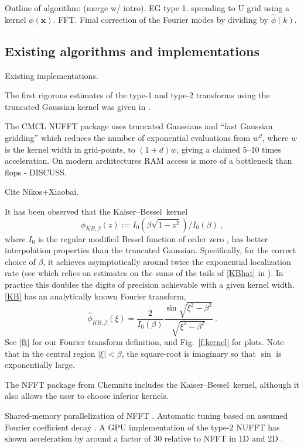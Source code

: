 \documentclass[10pt]{article}
\newcommand{\be}{\begin{equation}}
\newcommand{\ee}{\end{equation}}
\newcommand{\mbf}[1]{{\mathbf #1}}
\newcommand{\xx}{\mbf{x}}
\newcommand{\KB}{Kaiser--Bessel}
\newcommand{\freq}{\beta}          %
\begin{document}
Outline of algorithm: (merge w/ intro).
EG type 1.
spreading to U grid using a kernel $\phi(\xx)$.
FFT.
Final correction of the Fourier modes by dividing by
$\hat\phi(k)$.

\subsection{Existing algorithms and implementations}


Existing implementations.

The first rigorous estimates of the type-1 and type-2 transforms
using the truncated Gaussian kernel was given in \cite{dutt}.

The CMCL NUFFT package \cite{cmcl} uses truncated Gaussians
and ``fast Gaussian gridding'' \cite[Sec.~3]{nufft}
which reduces the number of exponential evaluations
from $w^d$, where $w$ is the kernel width in grid-points,
to $(1+d)w$, giving a claimed 5--10 times acceleration.
On modern architectures RAM access is more of a bottleneck than
flops - DISCUSS.

Cite Nikos+Xiaobai.

It has been observed that the \KB\ kernel
\be
\phi_{KB,\freq}(z) := I_0(\freq\sqrt{1-z^2}) / I_0(\freq)
~,
\label{KB}
\ee
where $I_0$ is the regular modified Bessel function of order zero
\cite[(10.25.2)]{DLMF}, has better interpolation
properties than the truncated Gaussian.
Specifically, for the correct choice of $\freq$, it achieves
asymptotically around twice the exponential localization rate
(see \cite[p.19, (C.1) vs (C.4)]{nfft} which relies on
estimates on the sums of the tails of \eqref{KBhat}
in \cite{fourmontthesis,fourmont,pottshabil}).
In practice this doubles the digits of precision achievable with
a given kernel width.
\eqref{KB} has an analytically known Fourier transform,
\be
\hat\phi_{KB,\freq}(\xi) = \frac{2}{I_0(\freq)}
\frac{\sin \sqrt{\xi^2-\freq^2}}{\sqrt{\xi^2-\freq^2}}
~.
\label{KBhat}
\ee
See \eqref{ft} for our Fourier transform definition,
and Fig.~\ref{f:kernel} for plots.
Note that in the central region $|\xi|<\freq$,
the square-root is imaginary so that $\sin$ is exponentially large.

The NFFT package \cite{nfft} from Chemnitz
includes the \KB\ kernel, although it also allows the user to
choose inferior kernels.

Shared-memory parallelization of NFFT \cite{volkmer}.
Automatic tuning based on assumed Fourier coefficient decay \cite{nestler}.
A GPU implementation of the type-2 NUFFT has shown acceleration by around
a factor of 30 relative to NFFT in 1D and 2D \cite{cunfft}.
\end{document}
